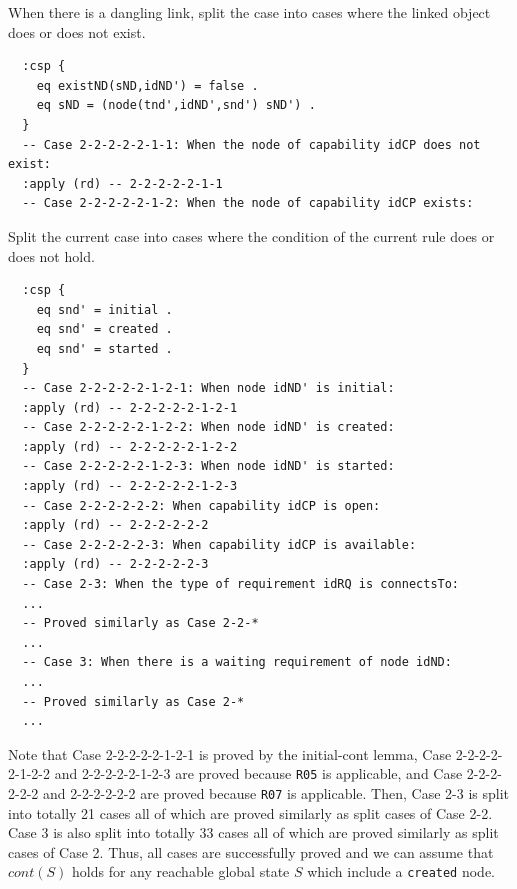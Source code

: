 \documentclass[12pt]{report}
\begin{document}
 When there is a dangling link, split the case
into cases where the linked object does or does not exist.
\small
\begin{verbatim}
  :csp {
    eq existND(sND,idND') = false .
    eq sND = (node(tnd',idND',snd') sND') .
  }
  -- Case 2-2-2-2-2-1-1: When the node of capability idCP does not exist:
  :apply (rd) -- 2-2-2-2-2-1-1
  -- Case 2-2-2-2-2-1-2: When the node of capability idCP exists:
\end{verbatim}
\normalsize
 Split the current case into cases where
the condition of the current rule does or does not hold.
\small
\begin{verbatim}
  :csp {
    eq snd' = initial .
    eq snd' = created .
    eq snd' = started .
  }
  -- Case 2-2-2-2-2-1-2-1: When node idND' is initial:
  :apply (rd) -- 2-2-2-2-2-1-2-1
  -- Case 2-2-2-2-2-1-2-2: When node idND' is created:
  :apply (rd) -- 2-2-2-2-2-1-2-2
  -- Case 2-2-2-2-2-1-2-3: When node idND' is started:
  :apply (rd) -- 2-2-2-2-2-1-2-3
  -- Case 2-2-2-2-2-2: When capability idCP is open:
  :apply (rd) -- 2-2-2-2-2-2
  -- Case 2-2-2-2-2-3: When capability idCP is available:
  :apply (rd) -- 2-2-2-2-2-3
  -- Case 2-3: When the type of requirement idRQ is connectsTo:
  ...
  -- Proved similarly as Case 2-2-*
  ...
  -- Case 3: When there is a waiting requirement of node idND:
  ...
  -- Proved similarly as Case 2-*
  ...
\end{verbatim}
\normalsize
Note that Case 2-2-2-2-2-1-2-1 is proved by the initial-cont lemma,
Case 2-2-2-2-2-1-2-2 and 2-2-2-2-2-1-2-3 are proved because {\tt R05}
is applicable, and Case 2-2-2-2-2-2 and 2-2-2-2-2-2 are proved because
{\tt R07} is applicable. Then, Case 2-3 is split into totally 21 cases
all of which are proved similarly as split cases of Case 2-2. Case 3 is
also split into totally 33 cases all of which are proved similarly as
split cases of Case 2.  Thus, all cases are successfully proved and we
can assume that $cont(S)$ holds for any reachable global state $S$
which include a {\tt created} node.

\end{document}
